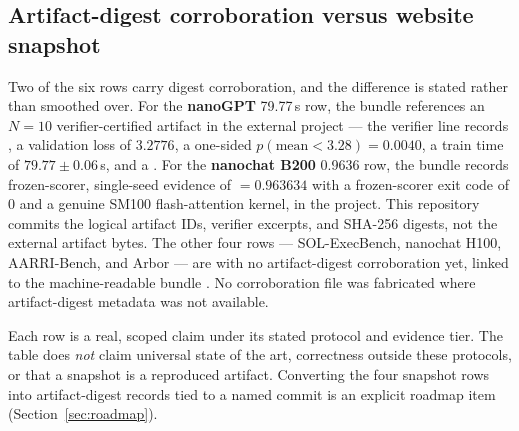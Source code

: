 \subsection{Artifact-digest corroboration versus website snapshot}

Two of the six rows carry digest corroboration, and the difference is stated
rather than smoothed over. For the \textbf{nanoGPT} 79.77\,s row, the bundle
references an $N{=}10$ verifier-certified artifact in the external
 project --- the verifier line records
, a validation loss of $3.2776$, a one-sided
$p(\text{mean}<3.28)=0.0040$, a train time of $79.77\pm0.06$\,s, and a
. For the \textbf{nanochat B200} 0.9636 row, the bundle records
frozen-scorer, single-seed evidence of  $=0.963634$ with a frozen-scorer exit
code of 0 and a genuine SM100 flash-attention kernel, in the
 project. This repository commits the logical
artifact IDs, verifier excerpts, and SHA-256 digests, not the external artifact
bytes. The other four rows --- SOL-ExecBench,
nanochat H100, AARRI-Bench, and Arbor --- are  with no
artifact-digest corroboration yet, linked to the machine-readable bundle
. No corroboration file was
fabricated where artifact-digest metadata was not available.

\begin{callout}
Each row is a real, scoped claim under its stated protocol and evidence tier. The
table does \emph{not} claim universal state of the art, correctness outside these
protocols, or that a snapshot is a reproduced artifact. Converting the four
snapshot rows into artifact-digest records tied to a named commit is an
explicit roadmap item (Section~\ref{sec:roadmap}).
\end{callout}
